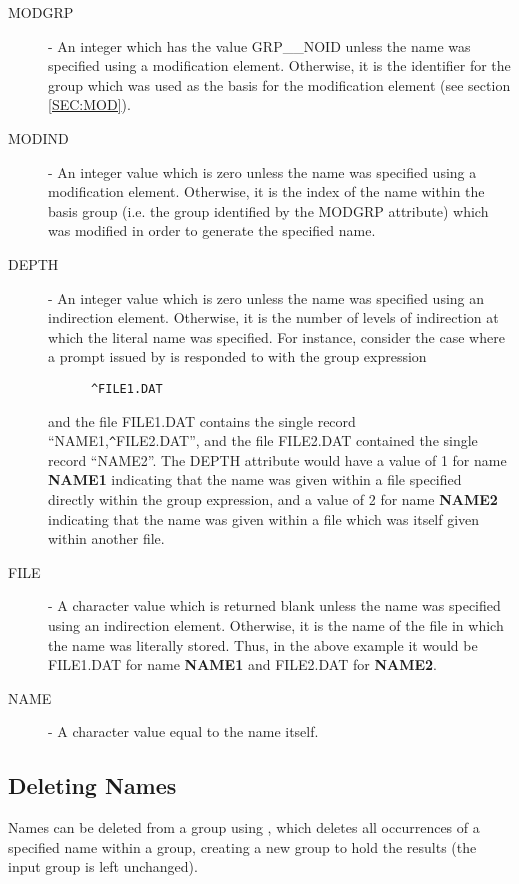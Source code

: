 \begin{description}
\item [MODGRP] - An integer which has the value GRP\_\_NOID unless the name was
specified using a modification element. Otherwise, it is the identifier for the
group which was used as the basis for the modification element (see section
\ref{SEC:MOD}).

\item [MODIND] - An integer value which is zero unless the name was specified
using a modification element. Otherwise, it is the index of the name within
the basis group (i.e. the group identified by the MODGRP attribute) which was
modified in order to generate the specified name.

\item [DEPTH] - An integer value which is zero unless the name was specified
using an indirection element. Otherwise, it is the number of levels of
indirection at which the literal name was specified. For instance, consider the
case where a prompt
issued by  is responded to with the group expression

\small
\begin{verbatim}
      ^FILE1.DAT
\end{verbatim}
\normalsize

and the file FILE1.DAT contains the single record ``NAME1,\verb+^+FILE2.DAT'',
and the file FILE2.DAT contained the single record ``NAME2''. The DEPTH
attribute would have a value of 1 for name {\bf NAME1} indicating that the name
was given within a file specified directly within the group expression, and a
value of 2 for name {\bf NAME2} indicating that the name was given within a file
which was itself given within another file.

\item [FILE] - A character value which is returned blank unless the name was
specified using an indirection element. Otherwise, it is the name of the file in
which the name was literally stored. Thus, in the above example it would be
FILE1.DAT for name {\bf NAME1} and FILE2.DAT for {\bf NAME2}.

\item [NAME] - A character value equal to the name itself.

\end{description}

\subsection{Deleting Names}
Names can be deleted from a group using , which deletes all
occurrences of a specified name within a group, creating a new group to hold the
results (the input group is left unchanged).

